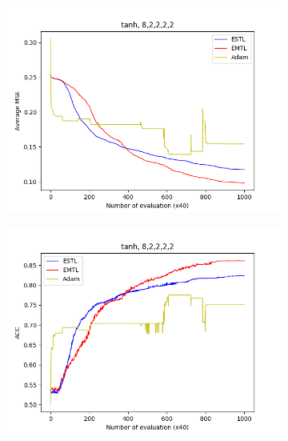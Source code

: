 \documentclass[conference]{IEEEtran}
\theoremstyle{definition}
\begin{document}
\begin{figure}
      \begin{subfigure}{0.48\linewidth}
        \centering
        \includegraphics[width=1.0\linewidth]{images/tanh/avg_mse8,2,2,2,2.png}
      \end{subfigure}
      \begin{subfigure}{0.48\linewidth}
        \centering
        \includegraphics[width=1.0\linewidth]{images/tanh/avg_acc8,2,2,2,2.png}
      \end{subfigure}


\end{figure}
\end{document}
